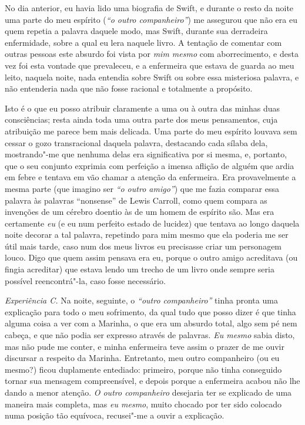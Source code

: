 No dia anterior, eu havia lido uma biografia de Swift, e durante o resto
da noite uma parte do meu espírito (\textit{“o outro companheiro”}) me
assegurou que não era eu quem repetia a palavra daquele modo, mas
Swift, durante sua derradeira enfermidade, sobre a qual eu lera naquele
livro.  A tentação de comentar com outras pessoas este absurdo foi
vista por \textit{mim mesmo} com aborrecimento, e desta vez foi esta
vontade que prevaleceu, e a enfermeira que estava de guarda ao meu
leito, naquela noite, nada entendia sobre Swift ou sobre essa
misteriosa palavra, e não entenderia nada que não fosse racional e
totalmente a propósito.  

Isto é o que eu posso atribuir claramente a uma ou à outra das minhas
duas consciências; resta ainda toda uma outra parte dos meus
pensamentos, cuja atribuição me parece bem mais delicada.  Uma parte do
meu espírito louvava sem cessar o gozo transracional daquela palavra,
destacando cada sílaba dela, mostrando"-me que nenhuma delas era
significativa por si mesma, e, portanto, que o seu conjunto exprimia
com perfeição  a imensa aflição de alguém que ardia em febre e tentava
em vão chamar a atenção da enfermeira.  Era provavelmente a mesma parte
 (que imagino ser \textit{“o outro amigo”}) que me fazia comparar essa
palavra às palavras “nonsense” de Lewis Carroll, como quem compara as
invenções de um cérebro doentio às de um homem de espírito são.  Mas
era certamente \textit{eu} (e eu num perfeito estado de lucidez)  que
tentava ao longo daquela noite decorar a tal palavra, repetindo para
mim mesmo que ela poderia me ser útil mais tarde, caso num dos meus
livros eu precisasse criar um personagem louco.  Digo que quem assim
pensava era eu, porque o outro amigo acreditava (ou fingia acreditar) 
que estava lendo um trecho de um livro onde sempre seria possível
reencontrá"-la, caso fosse necessário.

\textit{Experiência C.}  Na noite, seguinte, o \textit{“outro
companheiro”} tinha pronta uma explicação para todo o meu sofrimento,
da qual tudo que posso dizer é que tinha alguma coisa a ver com a
Marinha, o que era um absurdo total, algo sem pé nem cabeça, e que não
podia ser expresso através de palavras.  \textit{Eu mesmo} sabia disto,
mas não pude me conter, e minha enfermeira teve assim o prazer de me
ouvir discursar a respeito da Marinha.  Entretanto, meu outro
companheiro (ou eu mesmo?) ficou duplamente entediado: primeiro, porque
não tinha conseguido tornar sua mensagem compreensível, e depois porque
a enfermeira acabou não lhe dando a menor atenção.  \textit{O outro
companheiro} desejaria ter se explicado de uma maneira mais completa,
mas \textit{eu mesmo},\textit{ }muito chocado por ter sido colocado
numa posição tão equívoca, recusei"-me a ouvir a explicação.  

